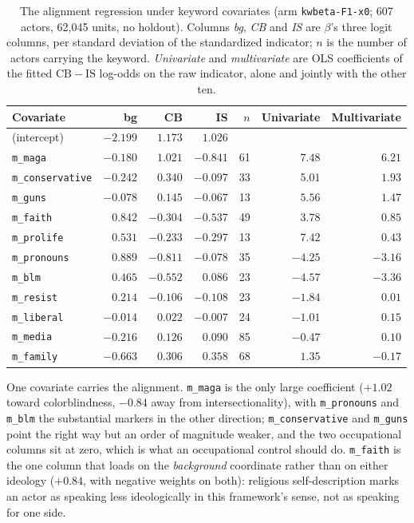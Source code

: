 \begin{table}[t]
\centering
\small
\caption{The alignment regression under keyword covariates (arm
\texttt{kwbeta-F1-x0}; 607 actors, 62{,}045 units, no holdout). Columns \emph{bg},
\emph{CB} and \emph{IS} are $\beta$'s three logit columns, per standard deviation of the
standardized indicator; $n$ is the number of actors carrying the keyword. \emph{Univariate}
and \emph{multivariate} are OLS coefficients of the fitted $\mathrm{CB}-\mathrm{IS}$
log-odds on the raw indicator, alone and jointly with the other ten.}
\label{tab:kwbeta}
\begin{tabular}{lrrrrrr}
\toprule
Covariate & bg & CB & IS & $n$ & Univariate & Multivariate \\
\midrule
(intercept)             & $-2.199$ & $1.173$  & $1.026$  &    &         &        \\
\addlinespace
\texttt{m\_maga}         & $-0.180$ & $1.021$  & $-0.841$ & 61 & $7.48$  & $6.21$  \\
\texttt{m\_conservative} & $-0.242$ & $0.340$  & $-0.097$ & 33 & $5.01$  & $1.93$  \\
\texttt{m\_guns}         & $-0.078$ & $0.145$  & $-0.067$ & 13 & $5.56$  & $1.47$  \\
\texttt{m\_faith}        & $0.842$  & $-0.304$ & $-0.537$ & 49 & $3.78$  & $0.85$  \\
\texttt{m\_prolife}      & $0.531$  & $-0.233$ & $-0.297$ & 13 & $7.42$  & $0.43$  \\
\addlinespace
\texttt{m\_pronouns}     & $0.889$  & $-0.811$ & $-0.078$ & 35 & $-4.25$ & $-3.16$ \\
\texttt{m\_blm}          & $0.465$  & $-0.552$ & $0.086$  & 23 & $-4.57$ & $-3.36$ \\
\texttt{m\_resist}       & $0.214$  & $-0.106$ & $-0.108$ & 23 & $-1.84$ & $0.01$  \\
\texttt{m\_liberal}      & $-0.014$ & $0.022$  & $-0.007$ & 24 & $-1.01$ & $0.15$  \\
\addlinespace
\texttt{m\_media}        & $-0.216$ & $0.126$  & $0.090$  & 85 & $-0.47$ & $0.10$  \\
\texttt{m\_family}       & $-0.663$ & $0.306$  & $0.358$  & 68 & $1.35$  & $-0.17$ \\
\bottomrule
\end{tabular}
\end{table}

One covariate carries the alignment. \texttt{m\_maga} is the only large coefficient
($+1.02$ toward colorblindness, $-0.84$ away from intersectionality), with
\texttt{m\_pronouns} and \texttt{m\_blm} the substantial markers in the other direction;
\texttt{m\_conservative} and \texttt{m\_guns} point the right way but an order of
magnitude weaker, and the two occupational columns sit at zero, which is what an
occupational control should do. \texttt{m\_faith} is the one column that loads on the
\emph{background} coordinate rather than on either ideology ($+0.84$, with negative
weights on both): religious self-description marks an actor as speaking less
ideologically in this framework's sense, not as speaking for one side.


